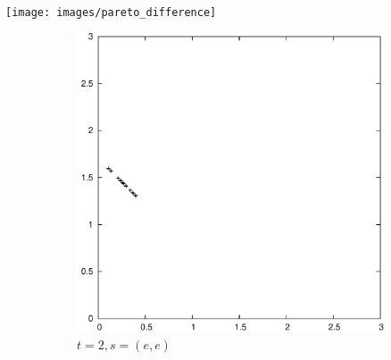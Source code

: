 \documentclass{article}
\makeatletter
\newenvironment{figurehere}
{\def\@captype{figure}}
{}
\makeatother
\begin{document}
\begin{multicols}{2}
	\vspace{.5cm}
	\begin{figurehere}
		\centering
		\texttt{[image: images/pareto\_difference]}
	   \label{fig:pareto_difference}
	\end{figurehere}
	\vspace{0.5cm}

	\end{multicols}

	\begin{figure}
		\centering
		\begin{subfigure}[b]{0.3\textwidth}
			\centering
			\includegraphics[width=\textwidth]{images/t2s0}
			\caption{$t=2, s=(e,e)$}
			\label{fig:t2s0}
		\end{subfigure}
		~
		\begin{subfigure}[b]{0.3\textwidth}
			\centering

\end{subfigure}
\end{figure}
\end{document}
